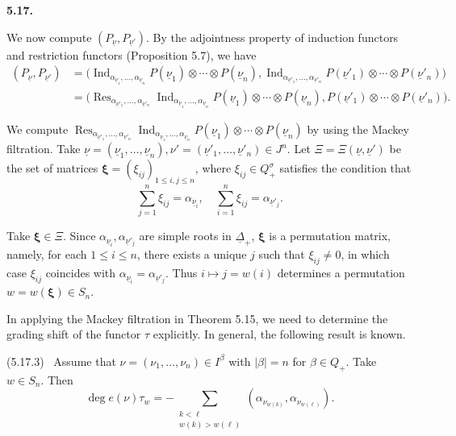 \documentclass[12pt]{amsart}
\renewcommand\a{\alpha}
\renewcommand\b{\beta}
\newcommand\s{\sigma}
\renewcommand\t{\tau}
\newcommand\vD{\varDelta}
\renewcommand{\1}{\mathbb 1}
\newcommand\Bxi{\boldsymbol\xi}
\newcommand\ul{\underline}
\newcommand\Ind{\operatorname{Ind}}
\newcommand\Res{\operatorname{Res}}
\numberwithin{equation}{section}
\def \para#1{\par\medskip\textbf{#1}
              \addtocounter{thm}{1}}
\begin{document}
\para{5.17.}
We now compute $(P_{\ul\nu}, P_{\ul\nu'})$. By the adjointness  property of
induction functors and restriction functors (Proposition 5.7), we have
\begin{align*}
\tag{5.17.1}  
  (P_{\ul\nu}, P_{\ul\nu'}) &= \bigl(\Ind_{\a_{\ul\nu_1}, \dots, \a_{\ul\nu_n}}
      P({\ul\nu_1})\otimes \cdots \otimes P(\ul\nu_n),
      \Ind_{\a_{\ul\nu'_1}, \dots, \a_{\ul\nu'_n}} P(\ul\nu'_1)\otimes
                     \cdots\otimes P(\ul\nu'_n)\bigr) \\
  &= \bigl(\Res_{\a_{\ul\nu'_1}, \dots, \a_{\ul\nu'_n}}
               \Ind_{\a_{\ul\nu_1}, \dots, \a_{\ul\nu_n}}
                 P(\ul\nu_1)\otimes \cdots \otimes P(\ul\nu_n),
                 P(\ul\nu'_1)\otimes\cdots\otimes P(\ul\nu'_n)\bigr).
\end{align*}  

We compute $\Res_{\a_{\ul\nu'_1}, \dots, \a_{\ul\nu'_n}}
  \Ind_{\a_{\ul\nu_1}, \dots, \a_{\ul\nu_n}}P(\ul\nu_1)\otimes \cdots \otimes P(\ul\nu_n)$
by using the Mackey filtration.
Take 
$\ul\nu = (\ul\nu_1, \dots, \ul\nu_n),\nu' = (\ul\nu'_1, \dots, \ul\nu'_n) \in J^n$.  
Let $\Xi = \Xi(\ul\nu, \ul\nu')$ be the set of matrices
$\Bxi = (\xi_{ij})_{1\le i,j \le n}$,
where $\xi_{ij} \in Q_+^{\s}$ satisfies the condition that
\begin{equation*}
\tag{5.17.2}  
\sum_{j = 1}^n \xi_{ij} = \a_{\ul\nu_i},  \quad \sum_{i=1}^n\xi_{ij} = \a_{\ul\nu'_j}. 
\end{equation*}  

Take $\Bxi \in \Xi$. Since $\a_{\ul\nu_i}, \a_{\ul\nu'_j}$ are simple roots in $\ul\vD_+$,
$\Bxi$ is a permutation matrix, namely,
for each $1 \le i \le n$, there exists a unique $j$ such that $\xi_{ij} \ne 0$,
in which case $\xi_{ij}$ coincides with $\a_{\ul\nu_i} = \a_{\ul\nu'_j}$. 
Thus $i \mapsto j = w(i)$ determines a permutation $w = w(\Bxi) \in S_n$.
\par
In applying the Mackey filtration in Theorem 5.15, we need to determine
the grading shift of the functor $\tau$ explicitly.
In general, the following result is known.
\par\medskip\noindent
(5.17.3) \ Assume that $\nu = (\nu_1, \dots, \nu_n) \in I^{\b}$
with $|\b| = n$  for $\b \in Q_+$.  Take $w \in S_n$.  Then
\begin{equation*}
  \deg e(\nu)\t_w = -\sum_{\substack{k < \ell  \\ w(k) > w(\ell)}}
                        (\a_{\nu_{w(k)}}, \a_{\nu_{w(\ell)}}).
\end{equation*}  
\end{document}
